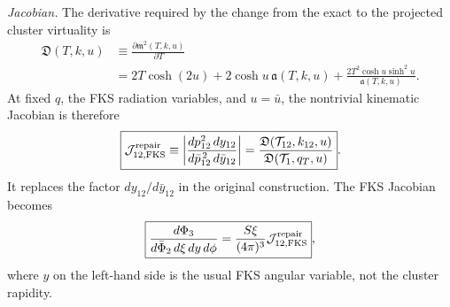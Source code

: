 \documentclass[11pt]{article}
\newcommand{\Ph}{\Phi}
\begin{document}
\medskip
\noindent
\textit{Jacobian.}
The derivative required by the change from the exact to the projected cluster virtuality is
\begin{align}
\mathfrak D(T,k,u)
&\equiv
\frac{\partial\mathfrak m^2(T,k,u)}{\partial T}
\nonumber\\
&=
2T\cosh(2u)
+2\cosh u\,\mathfrak a(T,k,u)
+\frac{
2T^2\cosh u\sinh^2u
}{
\mathfrak a(T,k,u)
}.
\label{eq:isrfsr-repair-D-function}
\end{align}
At fixed $q$, the FKS radiation variables, and $u=\bar u$, the nontrivial kinematic Jacobian is therefore
\begin{equation}
\boxed{
\mathcal J_{12,\rm FKS}^{\rm repair}
\equiv
\left|
\frac{d p_{12}^2\,dy_{12}}
{d\bar p_{12}^{\,2}\,d\bar y_{12}}
\right|
=
\frac{
\mathfrak D(\mathcal T_{12},k_{12},u)
}{
\mathfrak D(\mathcal T_1,q_T,u)
}
}.
\label{eq:isrfsr-repair-cluster-jacobian}
\end{equation}
It replaces the factor $dy_{12}/d\bar y_{12}$ in the original construction.  The FKS Jacobian becomes
\begin{equation}
\boxed{
\frac{d\Ph_3}
{d\bar\Ph_2\,d\xi\,dy\,d\phi}
=
\frac{S\xi}{(4\pi)^3}
\mathcal J_{12,\rm FKS}^{\rm repair}
},
\label{eq:isrfsr-repair-fks-jacobian}
\end{equation}
where $y$ on the left-hand side is the usual FKS angular variable, not the cluster rapidity.
\end{document}
